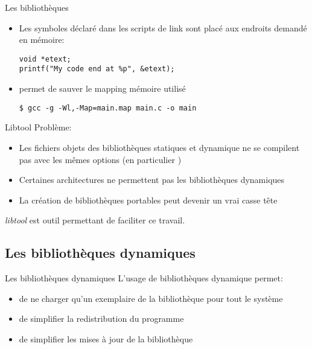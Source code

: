 \begin{frame}[fragile=singleslide]{Les bibliothèques}
  \begin{itemize} 
  \item  Les  symboles déclaré dans les scripts
    de link sont placé aux endroits demandé en mémoire:
    \begin{lstlisting}
void *etext;
printf("My code end at %p", &etext);
    \end{lstlisting} 
  \item {} permet de sauver le mapping mémoire utilisé
    \begin{lstlisting}
$ gcc -g -Wl,-Map=main.map main.c -o main
    \end{lstlisting} 
  \end{itemize}
\end{frame}

\begin{frame}[fragile=singleslide]{Libtool}
  Problème:
  \begin{itemize}
  \item Les  fichiers objets des bibliothèques  statiques et dynamique
    ne  se  compilent  pas  avec  les mêmes  options  (en  particulier
    )
  \item  Certaines architectures ne  permettent pas  les bibliothèques
    dynamiques
  \item La  création de bibliothèques  portables peut devenir  un vrai
    casse tête
  \end{itemize}
  \emph{libtool} est outil permettant de faciliter ce travail.
\end{frame}

\subsection{Les bibliothèques dynamiques}

\begin{frame}[fragile=singleslide]{Les bibliothèques dynamiques}
  L'usage de bibliothèques dynamique permet:
  \begin{itemize}
  \item de ne charger qu'un exemplaire de la bibliothèque pour tout le
    système
  \item de simplifier la redistribution du programme
  \item de simplifier les mises à jour de la bibliothèque
  \end{itemize}
\end{frame}

